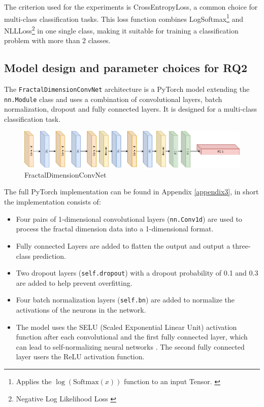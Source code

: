 The criterion used for the experiments is CrossEntropyLoss, a common choice for multi-class classification tasks. This loss function combines LogSoftmax\footnote{Applies the $\log (\text{Softmax} (x))$ function to an input Tensor. \citep{miranda2017softmax}} and NLLLoss\footnote{Negative Log Likelihood Loss \citep{miranda2017softmax}} in one single class, making it suitable for training a classification problem with more than 2 classes. 
\newpage
\subsection{Model design and parameter choices for RQ2}
The \verb|FractalDimensionConvNet| architecture is a PyTorch model extending the \newline \verb|nn.Module| class and uses a combination of convolutional layers, batch normalization, dropout and fully connected layers. It is designed for a multi-class classification task. 
\begin{figure}[H]
    \centering
    \includegraphics[width=1.0\textwidth]{Grad Assignment/Images/FD_architecture.drawio.png}
    \caption{FractalDimensionConvNet}
    \label{fig:FractalDimensionConvNet}
\end{figure}
The full PyTorch implementation can be found in Appendix \ref{appendix3}, in short the implementation consists of:
\begin{itemize}
    \item Four pairs of 1-dimensional convolutional layers (\verb|nn.Conv1d|) are used to process the fractal dimension data into a 1-dimensional format. 
    \item Fully connected Layers are added to flatten the output and output a three-class prediction. 
    \item Two dropout layers (\verb|self.dropout|) with a dropout probability of 0.1 and 0.3 are added to help prevent overfitting. 
    \item Four batch normalization layers (\verb|self.bn|) are added to normalize the activations of the neurons in the network. 
    \item The model uses the SELU (Scaled Exponential Linear Unit) activation function after each convolutional and the first fully connected layer, which can lead to self-normalizing neural networks \citep{rasamoelina2020review, kiliccarslan2021overview}. The second fully connected layer users the ReLU activation function. 
\end{itemize}

